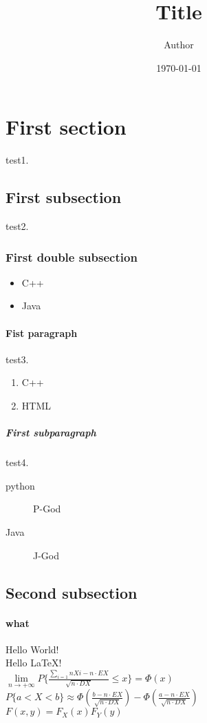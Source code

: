 \documentclass{article}
\author {Author}
\title {Title}%
\date{\today}
\begin{document}
\maketitle
\tableofcontents%
\section{First section} test1.%
    \subsection{First subsection} test2.%
        \subsubsection{First double subsection}%
        \begin{itemize}
          \item C++
          \item Java
        \end{itemize}
            \paragraph{Fist paragraph} test3.%
            \begin{enumerate}
              \item C++
              \item HTML
            \end{enumerate}
                \subparagraph{First subparagraph} test4.%
                \begin{description}%
                  \item[python] P-God
                  \item[Java] J-God
                \end{description}
    \subsection{Second subsection}%
        \paragraph{what\\}
Hello World! \\ %
Hello \LaTeX ! \\

$\lim\limits_{n \rightarrow +\infty} P\lbrace\frac{\sum\limits_{i=1}{n}Xi - n\cdot EX}{ \sqrt{n \cdot DX} }  \leqslant x\rbrace = \Phi(x)$ \\

$P\lbrace a<X<b \rbrace \approx \Phi(\frac{b - n\cdot EX}{\sqrt {n\cdot DX}}) - \Phi(\frac{a - n\cdot EX}{\sqrt{n\cdot DX} })$ \\

$F(x,y) = F_{X}(x)F_{Y}(y)$
\end{document}
